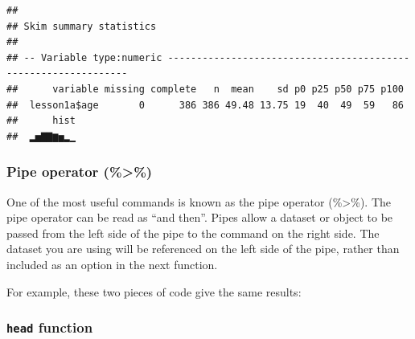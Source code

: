 \documentclass[]{book}
\newenvironment{Shaded}{\begin{snugshade}}{\end{snugshade}}
\newcommand{\CommentTok}[1]{\textcolor[rgb]{0.56,0.35,0.01}{\textit{#1}}}
\newcommand{\KeywordTok}[1]{\textcolor[rgb]{0.13,0.29,0.53}{\textbf{#1}}}
\newcommand{\NormalTok}[1]{#1}
\newcommand{\OperatorTok}[1]{\textcolor[rgb]{0.81,0.36,0.00}{\textbf{#1}}}
\newcommand{\StringTok}[1]{\textcolor[rgb]{0.31,0.60,0.02}{#1}}
\begin{document}
\begin{Shaded}
\end{Shaded}

\begin{verbatim}
## 
## Skim summary statistics
## 
## -- Variable type:numeric ---------------------------------------------------------------
##      variable missing complete   n  mean    sd p0 p25 p50 p75 p100
##  lesson1a$age       0      386 386 49.48 13.75 19  40  49  59   86
##      hist
##  ▂▅▇▇▆▅▂▁
\end{verbatim}

\hypertarget{pipe-operator}{%
\subsubsection{Pipe operator (\%\textgreater\%)}\label{pipe-operator}}

One of the most useful commands is known as the pipe operator
(\%\textgreater\%). The pipe operator can be read as ``and then''. Pipes
allow a dataset or object to be passed from the left side of the pipe to
the command on the right side. The dataset you are using will be
referenced on the left side of the pipe, rather than included as an
option in the next function.

For example, these two pieces of code give the same results:

\begin{Shaded}
\end{Shaded}

\hypertarget{head-function}{%
\subsubsection{\texorpdfstring{\texttt{head}
function}{head function}}\label{head-function}}
\end{document}
